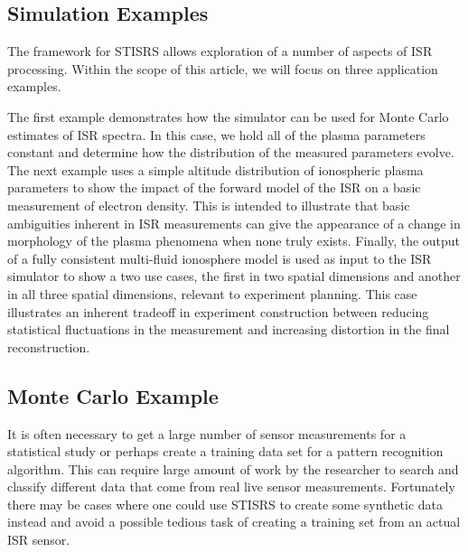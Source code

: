 \documentclass[draft,ras]{agutex}
\begin{document}
\begin{article}


\section{Simulation Examples}
The framework for STISRS allows exploration of a number of aspects of ISR processing. Within the scope of this article, we will focus on three application examples.

The first example demonstrates how the simulator can be used for Monte Carlo estimates of ISR spectra. In this case, we hold all of the plasma parameters constant and determine how the distribution of the measured parameters evolve. The next example uses a simple altitude distribution of ionospheric plasma parameters to show the impact of the forward model of the ISR on a basic measurement of electron density. This is intended to illustrate that basic ambiguities inherent in ISR measurements can give the appearance of a change in morphology of the plasma phenomena when none truly exists. Finally, the output of a fully consistent multi-fluid ionosphere model is used as input to the ISR simulator to show a two use cases, the first in two spatial dimensions and another in all three spatial dimensions, relevant to experiment planning. This case illustrates an inherent tradeoff in experiment construction between reducing statistical fluctuations in the measurement and increasing distortion in the final reconstruction. 

\subsection{Monte Carlo Example}

It is often necessary to get a large number of sensor measurements for a statistical study or perhaps create a training data set for a pattern recognition algorithm. This can require large amount of work by the researcher to search and classify different data that come from real live sensor measurements. Fortunately there may be cases where one could use STISRS to create some synthetic data instead and avoid a possible tedious task of creating a training set from an actual ISR sensor.


\end{article}
\end{document}
